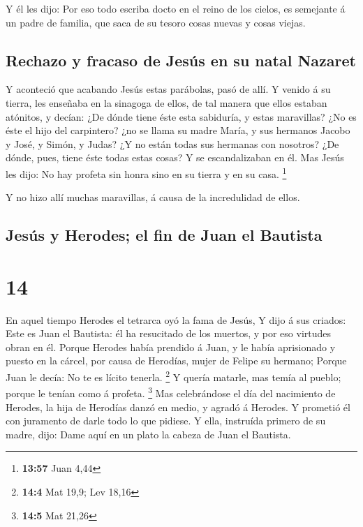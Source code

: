  Y él les dijo: Por eso todo escriba docto en el reino de
los cielos, es semejante á un padre de familia, que saca de su tesoro
cosas nuevas y cosas viejas.

\hypertarget{rechazo-y-fracaso-de-jesuxfas-en-su-natal-nazaret}{%
\subsection{Rechazo y fracaso de Jesús en su natal
Nazaret}\label{rechazo-y-fracaso-de-jesuxfas-en-su-natal-nazaret}}

 Y aconteció que acabando Jesús estas parábolas, pasó de
allí.  Y venido á su tierra, les enseñaba en la sinagoga de
ellos, de tal manera que ellos estaban atónitos, y decían: ¿De dónde
tiene éste esta sabiduría, y estas maravillas?  ¿No es éste
el hijo del carpintero? ¿no se llama su madre María, y sus hermanos
Jacobo y José, y Simón, y Judas?  ¿Y no están todas sus
hermanas con nosotros? ¿De dónde, pues, tiene éste todas estas cosas?
 Y se escandalizaban en él. Mas Jesús les dijo: No hay
profeta sin honra sino en su tierra y en su casa. \footnote{\textbf{13:57}
  Juan 4,44}

 Y no hizo allí muchas maravillas, á causa de la
incredulidad de ellos.

\hypertarget{jesuxfas-y-herodes-el-fin-de-juan-el-bautista}{%
\subsection{Jesús y Herodes; el fin de Juan el
Bautista}\label{jesuxfas-y-herodes-el-fin-de-juan-el-bautista}}

\hypertarget{section-13}{%
\section{14}\label{section-13}}

 En aquel tiempo Herodes el tetrarca oyó la fama de Jesús,
 Y dijo á sus criados: Este es Juan el Bautista: él ha
resucitado de los muertos, y por eso virtudes obran en él. 
Porque Herodes había prendido á Juan, y le había aprisionado y puesto en
la cárcel, por causa de Herodías, mujer de Felipe su hermano;
 Porque Juan le decía: No te es lícito tenerla. \footnote{\textbf{14:4}
  Mat 19,9; Lev 18,16}  Y quería matarle, mas temía al
pueblo; porque le tenían como á profeta. \footnote{\textbf{14:5} Mat
  21,26}  Mas celebrándose el día del nacimiento de Herodes,
la hija de Herodías danzó en medio, y agradó á Herodes.  Y
prometió él con juramento de darle todo lo que pidiese.  Y
ella, instruída primero de su madre, dijo: Dame aquí en un plato la
cabeza de Juan el Bautista.

